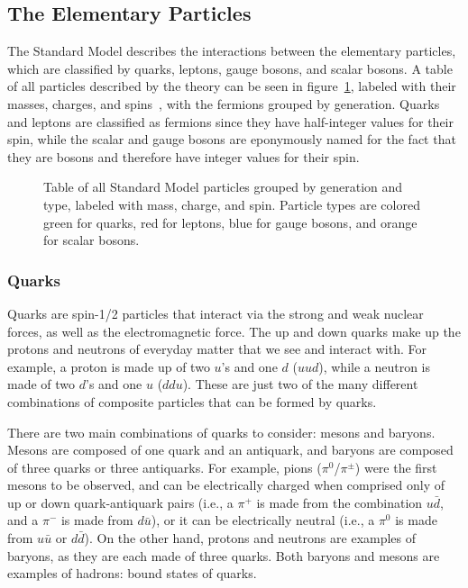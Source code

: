 \subsection{The Elementary Particles}
\label{subsec:particles}

The Standard Model describes the interactions between the elementary particles, which are classified by quarks, leptons, gauge bosons, and scalar bosons.
A table of all particles described by the theory can be seen in figure~\ref{fig:standardModel}, labeled with their masses, charges, and spins~\cite{PhysRevD.98.030001}, with the fermions grouped by generation.
Quarks and leptons are classified as fermions since they have half-integer values for their spin, while the scalar and gauge bosons are eponymously named for the fact that they are bosons and therefore have integer values for their spin.

\begin{figure}[htbp]
  \centering
  
  \caption{
    Table of all Standard Model particles grouped by generation and type, labeled with mass, charge, and spin.
    Particle types are colored green for quarks, red for leptons, blue for gauge bosons, and orange for scalar bosons.
  }
  \label{fig:standardModel}
\end{figure}

\subsubsection{Quarks}

Quarks are spin-1/2 particles that interact via the strong and weak nuclear forces, as well as the electromagnetic force.
The up and down quarks make up the protons and neutrons of everyday matter that we see and interact with.
For example, a proton is made up of two $u$'s and one $d$ ($uud$), while a neutron is made of two $d$'s and one $u$ ($ddu$).
These are just two of the many different combinations of composite particles that can be formed by quarks.

There are two main combinations of quarks to consider: mesons and baryons.
Mesons are composed of one quark and an antiquark, and baryons are composed of three quarks or three antiquarks.
For example, pions ($\pi^0$/$\pi^\pm$) were the first mesons to be observed, and can be electrically charged when comprised only of up or down quark-antiquark pairs (i.e., a $\pi^+$ is made from the combination $u\bar{d}$, and a $\pi^-$ is made from $d\bar{u}$), or it can be electrically neutral (i.e., a $\pi^0$ is made from $u\bar{u}$ or $d\bar{d}$).
On the other hand, protons and neutrons are examples of baryons, as they are each made of three quarks.
Both baryons and mesons are examples of hadrons: bound states of quarks.

